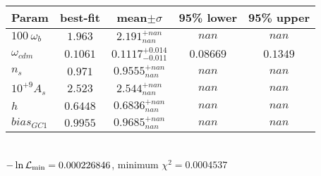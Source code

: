 \begin{tabular}{|l|c|c|c|c|} 
 \hline 
Param & best-fit & mean$\pm\sigma$ & 95\% lower & 95\% upper \\ \hline 
$100~\omega_{b }$ &$1.963$ & $2.191_{nan}^{+nan}$ & $nan$ & $nan$ \\ 
$\omega_{cdm }$ &$0.1061$ & $0.1117_{-0.011}^{+0.014}$ & $0.08669$ & $0.1349$ \\ 
$n_{s }$ &$0.971$ & $0.9555_{nan}^{+nan}$ & $nan$ & $nan$ \\ 
$10^{+9}A_{s }$ &$2.523$ & $2.544_{nan}^{+nan}$ & $nan$ & $nan$ \\ 
$h$ &$0.6448$ & $0.6836_{nan}^{+nan}$ & $nan$ & $nan$ \\ 
$bias_{GC 1 }$ &$0.9955$ & $0.9685_{nan}^{+nan}$ & $nan$ & $nan$ \\ 
\hline 
 \end{tabular} \\ 
$-\ln{\cal L}_\mathrm{min} =0.000226846$, minimum $\chi^2=0.0004537$ \\ 
